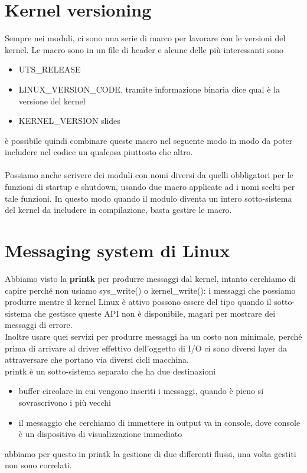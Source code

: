 \documentclass[12pt, oneside]{extbook}
\begin{document}
\section{Kernel versioning}
Sempre nei moduli, ci sono una serie di marco per lavorare con le versioni del kernel. Le macro sono in un file di header e alcune delle più interessanti sono 
\begin{itemize}
\item UTS\_RELEASE
\item LINUX\_VERSION\_CODE, tramite informazione binaria dice qual è la versione del kernel
\item KERNEL\_VERSION slides
\end{itemize}
è possibile quindi combinare queste macro nel seguente modo
in modo da poter includere nel codice un qualcosa piuttosto che altro.\\\\Possiamo anche scrivere dei moduli con nomi diversi da quelli obbligatori per le funzioni di startup e shutdown, usando due macro applicate ad i nomi scelti per tale funzioni. In questo modo quando il modulo diventa un intero sotto-sistema del kernel da includere in compilazione, basta gestire le macro.
\section{Messaging system di Linux}
Abbiamo visto la \textbf{printk} per produrre messaggi dal kernel, intanto cerchiamo di capire perché non usiamo sys\_write() o kernel\_write(): i messaggi che possiamo produrre mentre il kernel Linux è attivo possono essere del tipo quando il sotto-sistema che gestisce queste API non è disponibile, magari per mostrare dei messaggi di errore.\\Inoltre usare quei servizi per produrre messaggi ha un costo non minimale, perché prima di arrivare al driver effettivo dell'oggetto di I/O ci sono diversi layer da attraversare che portano via diversi cicli macchina.\\ printk è un sotto-sistema separato che ha due destinazioni
\begin{itemize}
\item buffer circolare in cui vengono inseriti i messaggi, quando è pieno si sovrascrivono i più vecchi
\item il messaggio che cerchiamo di immettere in output va in console, dove console è un dispositivo di visualizzazione immediato
\end{itemize}
abbiamo per questo in printk la gestione di due differenti flussi, una volta gestiti non sono correlati.
\end{document}

